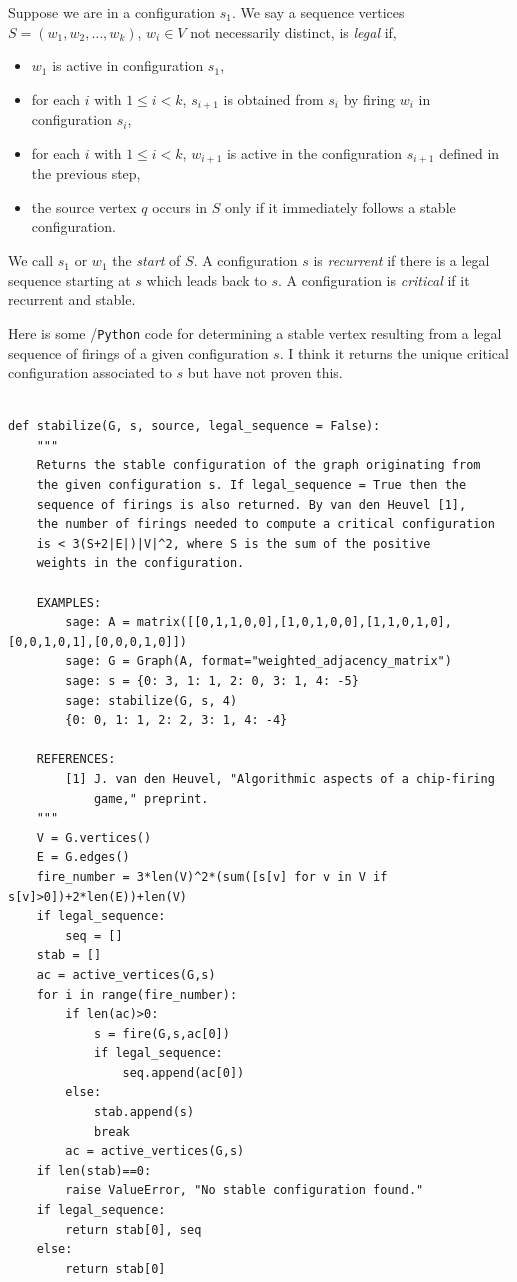 Suppose we are in a configuration $s_1$.
We say a sequence vertices $S=(w_1, w_2,\dots, w_k)$,
$w_i\in V$ not necessarily distinct, is
{\it legal} if, 
\begin{itemize}
\item
$w_1$ is active in configuration $s_1$,
\item
for each $i$ with $1\leq i<k$, $s_{i+1}$ is obtained
from $s_i$ by firing $w_i$ in configuration 
$s_i$, 
\item
for each $i$ with $1\leq i<k$, $w_{i+1}$ is active
in the configuration $s_{i+1}$ defined in the 
previous step,
\item
the source vertex $q$ occurs in $S$ only if
it immediately follows a stable configuration.
\end{itemize}
We call $s_1$ or $w_1$ the {\it start}
of $S$. A configuration $s$ is {\it recurrent}
if there is a legal sequence starting at $s$ which leads back to $s$.
A configuration is {\it critical}
if it recurrent and stable. 

Here is some \sage/{\tt Python} code for determining a stable
vertex resulting from a legal sequence of firings
of a given configuration $s$. I think it returns the
unique critical configuration associated to $s$ but have not
proven this.

\begin{Verbatim}[fontsize=\scriptsize,fontfamily=courier,fontshape=tt,frame=single,label=\sage]

def stabilize(G, s, source, legal_sequence = False):
    """
    Returns the stable configuration of the graph originating from
    the given configuration s. If legal_sequence = True then the
    sequence of firings is also returned. By van den Heuvel [1],
    the number of firings needed to compute a critical configuration 
    is < 3(S+2|E|)|V|^2, where S is the sum of the positive 
    weights in the configuration.

    EXAMPLES:
        sage: A = matrix([[0,1,1,0,0],[1,0,1,0,0],[1,1,0,1,0],[0,0,1,0,1],[0,0,0,1,0]])
        sage: G = Graph(A, format="weighted_adjacency_matrix")
        sage: s = {0: 3, 1: 1, 2: 0, 3: 1, 4: -5}
        sage: stabilize(G, s, 4)
        {0: 0, 1: 1, 2: 2, 3: 1, 4: -4}

    REFERENCES:
        [1] J. van den Heuvel, "Algorithmic aspects of a chip-firing
            game," preprint.
    """
    V = G.vertices()
    E = G.edges()
    fire_number = 3*len(V)^2*(sum([s[v] for v in V if s[v]>0])+2*len(E))+len(V)
    if legal_sequence:
        seq = []
    stab = []
    ac = active_vertices(G,s)
    for i in range(fire_number):
        if len(ac)>0:
            s = fire(G,s,ac[0])
            if legal_sequence:
                seq.append(ac[0])
        else:
            stab.append(s)
            break
        ac = active_vertices(G,s)
    if len(stab)==0:
        raise ValueError, "No stable configuration found."
    if legal_sequence:
        return stab[0], seq
    else:
        return stab[0]

\end{Verbatim}

